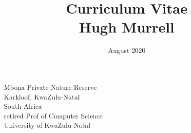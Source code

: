 \documentclass[12pt]{article}
\title{ Curriculum Vitae \\
           Hugh Murrell \\
        \vspace{0.5cm} }
\date{August 2020}
\begin{document}
\maketitle


\begin{figure}[ht]
\end{figure}
\begin{flushright}
\vspace{1.5cm}
Mbona Private Nature Reserve \\
Karkloof, KwaZulu-Natal \\
South Africa \\
\vspace{0.5cm}
retired Prof of Computer Science \\ 
University of KwaZulu-Natal \\

\end{flushright}

\newpage


\newpage

\newpage

\newpage

\newpage





\newpage

\newpage

\end{document}

